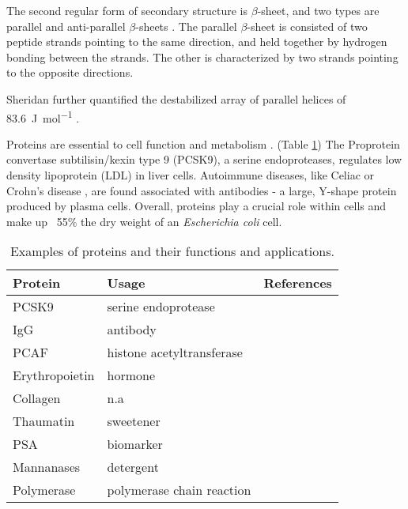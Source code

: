 \begin{refsection}
The second regular form of secondary structure is $\beta$-sheet, and two types
are parallel and anti-parallel $\beta$-sheets \cite{Astbury1932}. The parallel
$\beta$-sheet is consisted of two peptide strands pointing to the same
direction, and held together by hydrogen bonding between the strands. The other
is characterized by two strands pointing to the opposite directions.

Sheridan  further quantified the destabilized array of parallel
helices of \SI{83.6}{\joule\per\mol} \cite{Sheridan1982}.

Proteins are essential to cell function and metabolism
\cite{Lambert2012,Horton2007,Dessein2008}. (Table \ref{tab:protein-app}) The
Proprotein convertase subtilisin/kexin type 9 (PCSK9), a serine endoproteases,
regulates low density lipoprotein (LDL) in liver
cells\cite{Lambert2012,Horton2007}. Autoimmune diseases, like Celiac
\cite{Dessein2008} or Crohn's disease \cite{Sollid2005, Meize-Grochowski}, are
found associated with antibodies - a large, Y-shape protein produced by plasma
cells. Overall, proteins play a crucial role within cells and make up ~55\% the
dry weight of an \emph{Escherichia coli} cell\cite{Neidhardt1990}. 

\begin{table}[h!]
    \centering
    \begin{tabular}{ lll }
        \hline
        Protein & Usage & References \\
        \hline
        
        PCSK9 & serine endoprotease & \cite{Lambert2012,Horton2007} \\
        IgG & antibody & \cite{Sollid2005, Meize-Grochowski} \\
        PCAF & histone acetyltransferase & \cite{Mehta2011b} \\
        Erythropoietin & hormone & \cite{Haroon2003,Siren2001} \\
        Collagen & n.a & \cite{Bella1995} \\
        Thaumatin & sweetener & \cite{Green1999} \\
        PSA & biomarker & \cite{Crawford2014} \\
        Mannanases & detergent & \cite{Kirk2002} \\
        Polymerase & polymerase chain reaction & \cite{Berg2002} \\ 
        
        \hline
    \end{tabular}
    \caption[Examples of proteins and their funtions and applications.]{Examples of proteins
    and their functions and applications.} \label{tab:protein-app}
\end{table}
 

\end{refsection}
